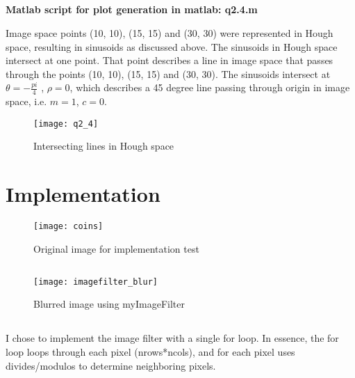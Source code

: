 \documentclass[12pt]{article}
\begin{document}
\newpage
\subsection{}
\textbf{Matlab script for plot generation in matlab: q2.4.m}

Image space points (10, 10), (15, 15) and (30, 30) were represented in Hough space, resulting in sinusoids as discussed above. The sinusoids in Hough space intersect at one point. That point describes a line in image space that passes through the points (10, 10), (15, 15) and (30, 30). The sinusoids intersect at $\theta = - \frac{pi}{4}$ , $\rho = 0$, which describes a 45 degree line passing through origin in image space, i.e. $m=1$, $c=0$.



\begin{figure}[H]
\centering
\texttt{[image: q2\_4]}
\caption{Intersecting lines in Hough space}    
\label{fig:intersect_hough}
\end{figure}   

\newpage
\section{Implementation}
\begin{figure}[H]
\centering
\texttt{[image: coins]}
\caption{Original image for implementation test}    
\label{fig:intersect_hough}
\end{figure}   

\subsection{}
\begin{figure}[H] \centering \texttt{[image: imagefilter\_blur]}
\caption{Blurred image using myImageFilter}    \end{figure}   


\newpage
\subsection{}
I chose to implement the image filter with a single for loop. In essence, the for loop loops through each pixel (nrows*ncols), and for each pixel uses divides/modulos to determine neighboring pixels.

\newpage
\end{document}
